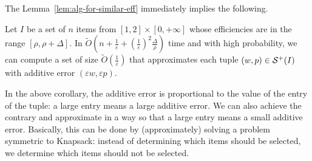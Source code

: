 \documentclass[a4paper,UKenglish,cleveref, autoref, thm-restate, pdfa]{lipics-v2021}
\newcommand{\eps}{\varepsilon}
\begin{document}
The Lemma~\ref{lem:alg-for-similar-eff} immediately implies the following.
\begin{corollary}\label{coro:approx-add}
    Let $I$ be a set of $n$ items from $[1, 2] \times [0, +\infty]$ whose efficiencies are in the range $[\rho, \rho + \Delta]$. In $\tilde{O}(n + \frac{1}{\eps} + (\frac{1}{\eps})^2 \frac{\Delta}{\rho})$ time and with high probability, we can compute a set of size $\tilde{O}(\frac{1}{\eps})$ that approximates each tuple $(w,p) \in {\cal S}^+(I)$ with additive error $(\eps w, \eps p)$. 
\end{corollary}

In the above corollary, the additive error is proportional to the value of the entry of the tuple: a large entry means a large additive error. We can also achieve the contrary and approximate in a way so that a large entry means a small additive error. Basically, this can be done by (approximately) solving a problem symmetric to Knapsack: instead of determining which items should be selected, we determine which items should not be selected. 
\end{document}
